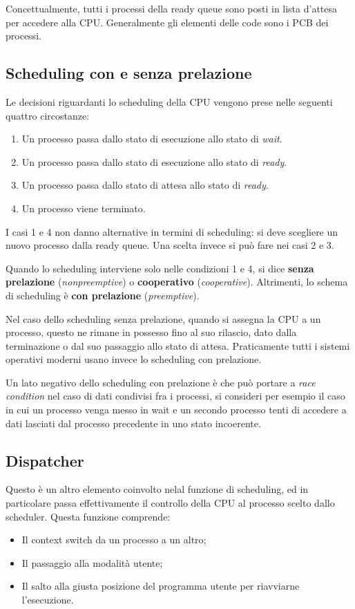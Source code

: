         Concettualmente, tutti i processi della ready queue sono posti in lista d'attesa per accedere alla CPU. Generalmente gli elementi delle code sono i PCB dei processi.
        
    \subsection{Scheduling con e senza prelazione}
        Le decisioni riguardanti lo scheduling della CPU vengono prese nelle seguenti quattro circostanze:
        \begin{enumerate}
            \item Un processo passa dallo stato di esecuzione allo stato di \textit{wait}.
            \item Un processo passa dallo stato di esecuzione allo stato di \textit{ready}.
            \item Un processo passa dallo stato di attesa allo stato di \textit{ready}.
            \item Un processo viene terminato.
        \end{enumerate}
        
        I casi 1 e 4 non danno alternative in termini di scheduling: si deve scegliere un nuovo processo dalla ready queue. Una scelta invece si può fare nei casi 2 e 3.
        
        Quando lo scheduling interviene solo nelle condizioni 1 e 4, si dice \textbf{senza prelazione} (\textit{nonpreemptive}) o \textbf{cooperativo} (\textit{cooperative}). Altrimenti, lo schema di scheduling è \textbf{con prelazione} (\textit{preemptive}).
        
        Nel caso dello scheduling senza prelazione, quando si assegna la CPU a un processo, questo ne rimane in possesso fino al suo rilascio, dato dalla terminazione o dal suo passaggio allo stato di attesa. Praticamente tutti i sistemi operativi moderni usano invece lo scheduling con prelazione.
        
        Un lato negativo dello scheduling con prelazione è che può portare a \textit{race condition} nel caso di dati condivisi fra i processi, si consideri per esempio il caso in cui un processo venga messo in wait e un secondo processo tenti di accedere a dati lasciati dal processo precedente in uno stato incoerente.
        
    \subsection{Dispatcher}
        Questo è un altro elemento coinvolto nelal funzione di scheduling, ed in particolare passa effettivamente il controllo della CPU al processo scelto dallo scheduler. Questa funzione comprende:
        \begin{itemize}
            \item Il context switch da un processo a un altro;
            \item Il passaggio alla modalità utente;
            \item Il salto alla giusta posizione del programma utente per riavviarne l'esecuzione.
        \end{itemize}
        
